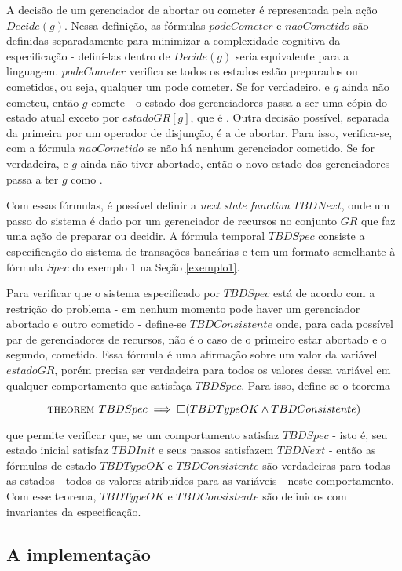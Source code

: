 A decisão de um gerenciador de abortar ou cometer é representada pela ação $Decide(g)$. Nessa definição, as fórmulas $podeCometer$ e $naoCometido$ são definidas separadamente para minimizar a complexidade cognitiva da especificação - definí-las dentro de $Decide(g)$ seria equivalente para a linguagem. $podeCometer$ verifica se todos os estados estão preparados ou cometidos, ou seja, qualquer um pode cometer. Se for verdadeiro, e $g$ ainda não cometeu, então $g$ comete - o estado dos gerenciadores passa a ser uma cópia do estado atual exceto por $estadoGR[g]$, que é \cometido. Outra decisão possível, separada da primeira por um operador de disjunção, é a de abortar. Para isso, verifica-se, com a fórmula $naoCometido$ se não há nenhum gerenciador cometido. Se for verdadeira, e $g$ ainda não tiver abortado, então o novo estado dos gerenciadores passa a ter $g$ como \abortado.

Com essas fórmulas, é possível definir a \textit{next state function} $TBDNext$, onde um passo do sistema é dado por um gerenciador de recursos no conjunto $GR$ que faz uma ação de preparar ou decidir. A fórmula temporal $TBDSpec$ consiste a especificação do sistema de transações bancárias e tem um formato semelhante à fórmula $Spec$ do exemplo 1 na Seção \ref{exemplo1}.

Para verificar que o sistema especificado por $TBDSpec$ está de acordo com a restrição do problema - em nenhum momento pode haver um gerenciador abortado e outro cometido - define-se $TBDConsistente$ onde, para cada possível par de gerenciadores de recursos, não é o caso de o primeiro estar abortado e o segundo, cometido. Essa fórmula é uma afirmação sobre um valor da variável $estadoGR$, porém precisa ser verdadeira para todos os valores dessa variável em qualquer comportamento que satisfaça $TBDSpec$. Para isso, define-se o teorema

\[\textsc{theorem } TBDSpec \implies \square(TBDTypeOK \land TBDConsistente)\]

que permite verificar que, se um comportamento satisfaz $TBDSpec$ - isto é, seu estado inicial satisfaz $TBDInit$ e seus passos satisfazem $TBDNext$ - então as fórmulas de estado $TBDTypeOK$ e $TBDConsistente$ são verdadeiras para todas as estados - todos os valores atribuídos para as variáveis - neste comportamento. Com esse teorema, $TBDTypeOK$ e $TBDConsistente$ são definidos com invariantes da especificação.

\subsection{A implementação}

